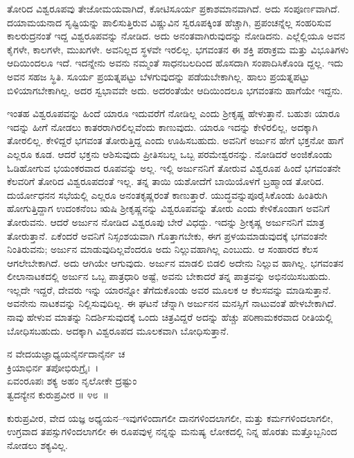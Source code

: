 ತೋರಿದ ವಿಶ್ವರೂಪವು ತೇಜೋಮಯವಾಗಿದೆ, ಕೋಟಿಸೂರ್ಯ ಪ್ರಕಾಶಮಾನವಾಗಿದೆ. ಅದು ಸಂಪೂರ್ಣವಾಗಿದೆ. ದಯಾಮಯನಾದ ಸೃಷ್ಟಿಯನ್ನು ಪಾಲಿಸುತ್ತಿರುವ ವಿಷ್ಣುವಿನ ಸ್ವರೂಪಕ್ಕಿಂತ ಹೆಚ್ಚಾಗಿ, ಪ್ರಪಂಚನ್ನೆಲ್ಲ ಸಂಹರಿಸುವ ಕಾಲರುದ್ರನಂತೆ ಇದ್ದ ವಿಶ್ವರೂಪವನ್ನು ನೋಡಿದ. ಅದು ಅನಂತವಾಗಿರುವುದನ್ನು ನೋಡಿದನು. ಎಲ್ಲೆಲ್ಲಿಯೂ ಅವನ ಕೈಗಳೇ, ಕಾಲಗಳೇ, ಮುಖಗಳೇ. ಅವನಿಲ್ಲದ ಸ್ಥಳವೇ ಇರಲಿಲ್ಲ. ಭಗವಂತನ ಈ ಶಕ್ತಿ ಪರಾಕ್ರಮ ಮತ್ತು ವಿಭೂತಿಗಳು ಆದಿಯಿಂದಲೂ ಇದೆ. ಇದನ್ನೇನು ಅವನು ನಮ್ಮಂತೆ ಸಾಧನಬಲದಿಂದ ಹೊಸದಾಗಿ ಸಂಪಾದಿಸಿಕೊಂಡಿ ದ್ದಲ್ಲ. ಇದು ಅವನ ಸಹಜ ಸ್ಥಿತಿ. ಸೂರ್ಯ ಪ್ರಯತ್ನಪಟ್ಟು ಬೆಳಗುವುದನ್ನು ಪಡೆಯಬೇಕಾಗಿಲ್ಲ. ಹಾಲು ಪ್ರಯತ್ನಪಟ್ಟು ಬಿಳಿಯಾಗಬೇಕಾಗಿಲ್ಲ. ಅದರ ಸ್ವಭಾವವೇ ಅದು. ಅದರಂತೆಯೇ ಆದಿಯಿಂದಲೂ ಭಗವಂತನು ಹಾಗೆಯೇ ಇದ್ದನು.

ಇಂತಹ ವಿಶ್ವರೂಪವನ್ನು ಹಿಂದೆ ಯಾರೂ ಇದುವರೆಗೆ ನೋಡಿಲ್ಲ ಎಂದು ಶ‍್ರೀಕೃಷ್ಣ ಹೇಳುತ್ತಾನೆ. ಬಹುಶಃ ಯಾರೂ ಇದನ್ನು ಹೀಗೆ ನೋಡಲು ಕಾತರರಾಗಿರಲಿಲ್ಲವೆಂದು ಕಾಣುವುದು. ಯಾರೂ ಇದನ್ನು ಕೇಳಿರಲಿಲ್ಲ, ಅದಕ್ಕಾಗಿ ತೋರಲಿಲ್ಲ. ಕೇಳಿದ್ದರೆ ಭಗವಂತ ತೋರುತ್ತಿದ್ದ ಎಂದು ಊಹಿಸಬಹುದು. ಅವನಿಗೆ ಅರ್ಜುನ ಹೇಗೆ ಭಕ್ತನೋ ಹಾಗೆ ಎಲ್ಲರೂ ಕೂಡ. ಆದರೆ ಭಕ್ತನು ಆಶಿಸುವುದು ಪ್ರೀತಿಸಬಲ್ಲ ಒಬ್ಬ ಪರಮೇಶ್ವರನನ್ನು. ನೋಡಿದರೆ ಅಂಜಿಕೊಂಡು ಓಡಿಹೋಗುವ ಭಯಂಕರವಾದ ರೂಪವನ್ನು ಅಲ್ಲ. ಇಲ್ಲಿ ಅರ್ಜುನನಿಗೆ ತೋರುವ ವಿಶ್ವರೂಪ ಹಿಂದೆ ಭಗವಂತನೇ ಕೆಲವರಿಗೆ ತೋರಿದ ವಿಶ್ವರೂಪದಂತೆ ಇಲ್ಲ. ತನ್ನ ತಾಯಿ ಯಶೋದೆಗೆ ಬಾಯಿಯೊಳಗೆ ಬ್ರಹ್ಮಾಂಡ ತೋರಿದ. ದುರ್ಯೋಧನನ ಸಭೆಯಲ್ಲಿ ಎಲ್ಲರೂ ಅನಂತಕೃಷ್ಣರಂತೆ ಕಾಣುತ್ತಾರೆ. ಯುದ್ಧವನ್ನು\break ಪೂರೈಸಿಕೊಂಡು ಹಿಂತಿರುಗಿ ಹೋಗುತ್ತಿದ್ದಾಗ ಉದಂಕನೆಂಬ ಋಷಿ ಶ‍್ರೀಕೃಷ್ಣನನ್ನು ವಿಶ್ವರೂಪವನ್ನು ತೋರು ಎಂದು ಕೇಳಿಕೊಂಡಾಗ ಅವನಿಗೆ ತೋರುವನು. ಆದರೆ ಅರ್ಜುನ ನೋಡಿದ ವಿಶ್ವರೂಪು ಬೇರೆ ವಿಧದ್ದು. ಇದನ್ನು ಶ‍್ರೀಕೃಷ್ಣ ಅರ್ಜುನನಿಗೆ ಮಾತ್ರ ತೋರುತ್ತಾನೆ. ಏಕೆಂದರೆ ಅವನಿಗೆ ನಿಸ್ಸಂಶಯವಾಗಿ ಗೊತ್ತಾಗಬೇಕು, ಈಗ ಪ್ರಳಯಮಾಡುವುದಕ್ಕೆ ಭಗವಂತನೇ ನಿಂತಿರು\-ವನು; ಅರ್ಜುನ ಮಾಡುವುದಿಲ್ಲವೆಂದರೂ ಅದು ನಿಲ್ಲುವಹಾಗಿಲ್ಲ ಎಂಬುದು. ಆ ಸಂಹಾರದ ಕೆಲಸ ಆಗಲೇಬೇಕಾಗಿದೆ. ಅದು ಆಗಿಯೇ ಆಗುವುದು. ಅರ್ಜುನ ಮಾಡಲಿ ಬಿಡಲಿ ಅದೇನು ನಿಲ್ಲುವ ಹಾಗಿಲ್ಲ. ಭಗವಂತನ ಲೀಲಾನಾಟಕದಲ್ಲಿ ಅರ್ಜುನ ಒಬ್ಬ ಪಾತ್ರಧಾರಿ ಅಷ್ಟೆ, ಅವನು ಬೇಕಾದರೆ ತನ್ನ ಪಾತ್ರವನ್ನು ಅಭಿನಯಿಸಬಹುದು. ಇಲ್ಲದೇ ಇದ್ದರೆ, ದೇವರು ಇನ್ನು ಯಾರನ್ನೋ ತೆಗೆದುಕೊಂಡು ಅವರ ಮೂಲಕ ಆ ಕೆಲಸವನ್ನು ಮಾಡಿಸುತ್ತಾನೆ. ಅವನೇನು ನಾಟಕವನ್ನು ನಿಲ್ಲಿಸುವುದಿಲ್ಲ. ಈ ಘಟನೆ ಚೆನ್ನಾಗಿ ಅರ್ಜುನನ ಮನಸ್ಸಿಗೆ ನಾಟುವಂತೆ ಹೇಳಬೇಕಾಗಿದೆ. ನಾವು ಹೇಳುವ ಮಾತನ್ನು ನಿದರ್ಶಿಸುವುದಕ್ಕೆ ಒಂದು ಚಿತ್ರವಿದ್ದರೆ ಅದನ್ನು ಹೆಚ್ಚು ಪರಿಣಾಮಕರವಾದ ರೀತಿಯಲ್ಲಿ ಬೋಧಿಸಬಹುದು. ಅದಕ್ಕಾಗಿ ವಿಶ್ವರೂಪದ ಮೂಲಕವಾಗಿ ಬೋಧಿಸುತ್ತಾನೆ.

\begin{shloka}
ನ ವೇದಯಜ್ಞಾಧ್ಯಯನೈರ್ನದಾನೈರ್ನ ಚ\\ ಕ್ರಿಯಾಭಿರ್ನ ತಪೋಭಿರುಗ್ರೈಃ~।\\ಏವಂರೂಪಃ ಶಕ್ಯ ಅಹಂ ನೃಲೋಕೇ ದ್ರಷ್ಟುಂ\\ ತ್ವದನ್ಯೇನ ಕುರುಪ್ರವೀರ \hfill॥ ೪೮~॥
\end{shloka}

\begin{artha}
ಕುರುಪ್ರವೀರ, ವೇದ ಯಜ್ಞ ಅಧ್ಯಯನ–ಇವುಗಳಿಂದಾಗಲೀ ದಾನಗಳಿಂದಲಾಗಲೀ, ಮತ್ತು ಕರ್ಮಗಳಿಂದಲಾಗಲೀ, ಉಗ್ರವಾದ ತಪಸ್ಸುಗಳಿಂದಲಾಗಲೀ ಈ ರೂಪವುಳ್ಳ ನನ್ನನ್ನು ಮನುಷ್ಯ ಲೋಕದಲ್ಲಿ ನಿನ್ನ ಹೊರತು ಮತ್ತೊಬ್ಬನಿಂದ ನೋಡಲು ಶಕ್ಯವಿಲ್ಲ.
\end{artha}

